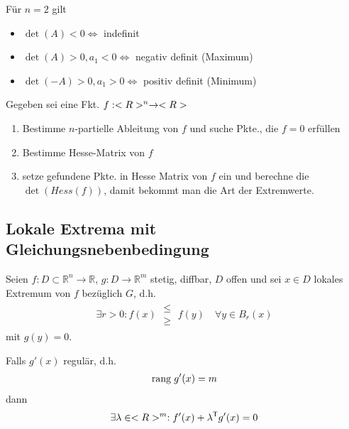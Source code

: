 \begin{boldenvironment}
	Für $n=2$ gilt
	\begin{itemize}
		\item $\det(A)<0\Leftrightarrow$ indefinit
		\item $\det(A)>0, a_1<0\Leftrightarrow$ negativ definit (Maximum)
		\item $\det(-A)>0, a_1>0\Leftrightarrow$ positiv definit (Minimum)
	\end{itemize}
\end{boldenvironment}

\begin{boldenvironment}\vspace*{0pt}
	Gegeben sei eine Fkt. $f: <R>^n \to <R>$
	\begin{enumerate}[label={\alph*)},topsep=\dimexpr-\baselineskip/2\relax]
		\item Bestimme $n$-partielle Ableitung von $f$ und suche Pkte., die $f=0$ erfüllen
		\item Bestimme Hesse-Matrix von $f$
		\item setze gefundene Pkte.  in Hesse Matrix von $f$ ein und berechne die $\det(Hess(f))$, damit bekommt man die Art der Extremwerte.
	\end{enumerate}
\end{boldenvironment}

\subsection{Lokale Extrema mit Gleichungsnebenbedingung}
\begin{proposition}
	Seien $f:D\subset\mathbb{R}^n\to\mathbb{R}$, $g:D\to\mathbb{R}^m$ stetig, diffbar, $D$ offen und sei $x\in D$ lokales Extremum von $f$ bezüglich $G$, d.h. \begin{align*}\exists r > 0: f(x)\; \substack{\le \\ \ge}\; f(y)\quad\forall y\in B_r(x)\end{align*} mit $g(y) = 0$.
	
	Falls $g'(x)$ regulär, d.h. \begin{align}
	\mathrm{rang}\; g'(x) = m\notag \end{align}dann
	\begin{align}
	\exists \lambda\in<R>^m: f'(x) + \lambda^\mathsf{T} g'(x) = 0\notag\end{align}
\end{proposition}

